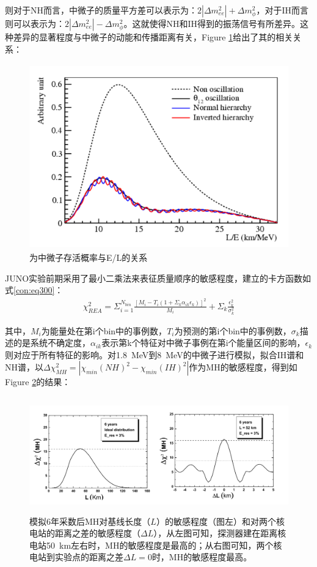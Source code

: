 \documentclass[10pt,a4paper]{article}
\begin{document}
则对于NH而言，中微子的质量平方差可以表示为：$2|\Delta{m_{ee}^2}|+\Delta{m_{\phi}^2}$，对于IH而言则可以表示为：$2|\Delta{m_{ee}^2}|-\Delta{m_{\phi}^2}$。这就使得NH和IH得到的振荡信号有所差异。这种差异的显著程度与中微子的动能和传播距离有关，Figure \ref{fig:11}给出了其的相关关系：
\begin{figure}[H]
 \centering
 \includegraphics[height=8cm]{images/L-selet.png}
 \caption{为中微子存活概率与E/L的关系\cite{2016Neutrino}}
 \label{fig:11}
\end{figure}


JUNO实验前期采用了最小二乘法来表征质量顺序的敏感程度，建立的卡方函数如式\eqref{con:eq300}：
\begin{equation}
 \label{con:eq300}
 \begin{split}
    \chi_{REA}^2=\Sigma_{i=1}^{N_{bin}}\frac{[M_i-T_i(1+\Sigma_{k}\alpha_{ik} \epsilon_{k})]^2}{M_{i}}+\Sigma_{k}
\frac{\epsilon_k^2}{\sigma_k^2} 
\end{split}
 \end{equation}

其中，$M_i$为能量处在第i个bin中的事例数，$T_i$为预测的第i个bin中的事例数，$\sigma_k$描述的是系统不确定度，$\alpha_{ik}$表示第k个特征对中微子事例在第i个能量区间的影响，$\epsilon_k$则对应于所有特征的影响。对\SI{1.8}{MeV}到\SI{8}{MeV}的中微子进行模拟，拟合IH谱和NH谱，以$\Delta\chi_{MH}^2=|\chi_{min}(NH)^2-\chi_{min}(IH)^2|
$作为MH的敏感程度，得到如Figure \ref{fig:21}的结果\cite{2016Neutrino}：


\begin{figure}[H]
 \centering
 \includegraphics[height=5cm]{images/L-selet1.png}
 \caption{模拟6年采数后MH对基线长度（$L$）的敏感程度（图左）和对两个核电站的距离之差的敏感程度（$\Delta L$），从左图可知，探测器建在距离核电站\SI{50}{km}左右时，MH的敏感程度是最高的；从右图可知，两个核电站到实验点的距离之差$\Delta L=0$时，MH的敏感程度最高。}
 \label{fig:21}
\end{figure}
\end{document}

